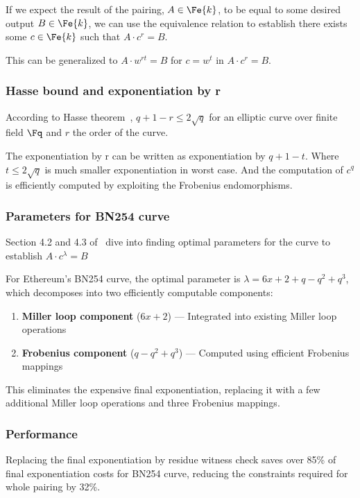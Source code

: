 If we expect the result of the pairing, $A \in \Fe{k}$, to be equal to some desired output $B \in \Fe{k}$, we can use the equivalence relation to establish there exists some $c \in \Fe{k}$ such that $A \cdot c^r = B$.

This can be generalized to $A \cdot w^{rt} = B$ for $c = w^t$ in $A \cdot c^r = B$.

\subsubsection{Hasse bound and exponentiation by r}

According to Hasse theorem~\cite{Sil09}, $q + 1 - r \leq 2\sqrt{q}$ for an elliptic curve over finite field $\Fq$ and  $r$ the order of the curve.

The exponentiation by r can be written as exponentiation by $q + 1 - t$. Where $t \leq 2\sqrt{q}$ is much smaller exponentiation in worst case. And the computation of $c^{q}$ is efficiently computed by exploiting the Frobenius endomorphisms.

\subsubsection{Parameters for BN254 curve}
Section 4.2 and 4.3 of~\cite{EPRINT:NovEag24} dive into finding optimal parameters for the curve to establish $A \cdot c^\lambda = B$

For Ethereum's BN254 curve, the optimal parameter is $\lambda = 6x + 2 + q - q^2 + q^3$, which decomposes into two efficiently computable components:

\begin{enumerate}
\item \textbf{Miller loop component} ($6x + 2$) --- Integrated into existing Miller loop operations
\item \textbf{Frobenius component} ($q - q^2 + q^3$) --- Computed using efficient Frobenius mappings
\end{enumerate}

This eliminates the expensive final exponentiation, replacing it with a few additional Miller loop operations and three Frobenius mappings.

\subsubsection{Performance}

Replacing the final exponentiation by residue witness check saves over 85\% of final exponentiation costs for BN254 curve, reducing the constraints required for whole pairing by 32\%.

